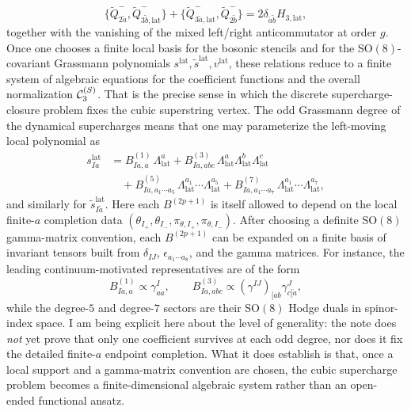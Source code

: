 \documentclass[11pt]{article}
\numberwithin{equation}{section}
\begin{document}
\begin{equation}
\label{eq:s15-008}
\{\widetilde Q^-_{2\widetilde a},\widetilde Q^-_{3\widetilde b,\mathrm{lat}}\}
+\{\widetilde Q^-_{3\widetilde a,\mathrm{lat}},\widetilde Q^-_{2\widetilde b}\}
=
2\delta_{\widetilde a\widetilde b}H_{3,\mathrm{lat}},
\end{equation}
together with the vanishing of the mixed left/right anticommutator at order $g$. Once one chooses a finite local basis for the bosonic stencils and for the SO$(8)$-covariant Grassmann polynomials $s^{\mathrm{lat}},\widetilde s^{\mathrm{lat}},v^{\mathrm{lat}}$, these relations reduce to a finite system of algebraic equations for the coefficient functions and the overall normalization ${\cal C}_3^{(S)}$. That is the precise sense in which the discrete supercharge-closure problem fixes the cubic superstring vertex.
The odd Grassmann degree of the dynamical supercharges means that one may parameterize the left-moving local polynomial as
\begin{equation}
\label{eq:s15-009}
\begin{aligned}
s^{\mathrm{lat}}_{I\dot a}
&=
B^{(1)}_{I\dot a,a}\,\Lambda_{\mathrm{lat}}^a
+B^{(3)}_{I\dot a,abc}\,\Lambda_{\mathrm{lat}}^a\Lambda_{\mathrm{lat}}^b\Lambda_{\mathrm{lat}}^c\\
&\quad
+B^{(5)}_{I\dot a,a_1\cdots a_5}\,
\Lambda_{\mathrm{lat}}^{a_1}\cdots\Lambda_{\mathrm{lat}}^{a_5}
+B^{(7)}_{I\dot a,a_1\cdots a_7}\,
\Lambda_{\mathrm{lat}}^{a_1}\cdots\Lambda_{\mathrm{lat}}^{a_7},
\end{aligned}
\end{equation}
and similarly for $\widetilde s^{\mathrm{lat}}_{I\widetilde a}$. Here each $B^{(2p+1)}$ is itself allowed to depend on the local finite-$a$ completion data $(\theta_{I_+},\theta_{I_-},\pi_{\theta,I_+},\pi_{\theta,I_-})$. After choosing a definite SO$(8)$ gamma-matrix convention, each $B^{(2p+1)}$ can be expanded on a finite basis of invariant tensors built from $\delta_{IJ}$, $\epsilon_{a_1\cdots a_8}$, and the gamma matrices. For instance, the leading continuum-motivated representatives are of the form
\begin{equation}
\label{eq:s15-010}
B^{(1)}_{I\dot a,a}\propto \gamma^I_{a\dot a},
\qquad
B^{(3)}_{I\dot a,abc}\propto (\gamma^{IJ})_{[ab}\gamma^J_{c]\dot a},
\end{equation}
while the degree-$5$ and degree-$7$ sectors are their SO$(8)$ Hodge duals in spinor-index space. I am being explicit here about the level of generality: the note does \emph{not} yet prove that only one coefficient survives at each odd degree, nor does it fix the detailed finite-$a$ endpoint completion. What it does establish is that, once a local support and a gamma-matrix convention are chosen, the cubic supercharge problem becomes a finite-dimensional algebraic system rather than an open-ended functional ansatz.
\end{document}
